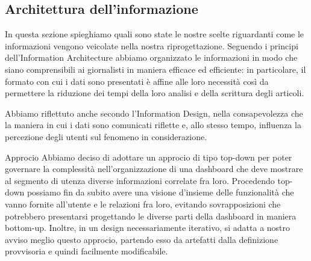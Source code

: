 \subsection{Architettura dell'informazione}

In questa sezione spieghiamo quali sono state le nostre scelte riguardanti come le informazioni vengono veicolate nella nostra riprogettazione.
Seguendo i principi dell'Information Architecture abbiamo organizzato le informazioni in modo che siano comprensibili ai giornalisti in maniera efficace ed efficiente: in particolare, il formato con cui i dati sono presentati  è affine alle loro necessità così da permettere la riduzione dei tempi della loro analisi e della scrittura degli articoli. 

Abbiamo riflettuto anche secondo l'Information Design, nella consapevolezza che la maniera in cui i dati sono comunicati riflette e, allo stesso tempo, influenza la percezione degli utenti sul fenomeno in considerazione.

Approcio
Abbiamo deciso di adottare un approcio di tipo top-down per poter governare la complessità nell'organizzazione di una dashboard che deve mostrare al segmento di utenza diverse informazioni correlate fra loro.
Procedendo top-down possiamo fin da subito avere una visione d'insieme delle funzionalità che vanno fornite all'utente e le relazioni fra loro, evitando sovrapposizioni che potrebbero presentarsi progettando le diverse parti della dashboard in maniera bottom-up.
Inoltre, in un design necessariamente iterativo, si adatta a nostro avviso meglio questo  approcio, partendo esso da artefatti dalla definizione provvisoria e quindi facilmente modificabile.


